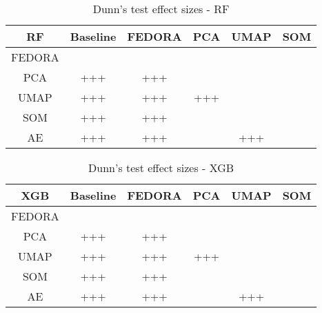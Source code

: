 {\begin{table}[h!]
\centering
\caption{Dunn's test effect sizes - RF}
\label{table:dunn-rf_200_100}
    \begin{tabular}{|c|c|c|c|c|c|}
        \hline
         RF             & Baseline         & FEDORA           & PCA              & UMAP             & SOM               \\
        \hline
         FEDORA         &                  & \cellcolor{gray} & \cellcolor{gray} & \cellcolor{gray} & \cellcolor{gray}  \\
         PCA            & +++              & +++              & \cellcolor{gray} & \cellcolor{gray} & \cellcolor{gray}  \\
         UMAP           & +++              & +++              & +++              & \cellcolor{gray} & \cellcolor{gray}  \\
         SOM            & +++              & +++              &                  &                  & \cellcolor{gray}  \\
         AE             & +++              & +++              &                  & +++              &                   \\
        \hline
    \end{tabular}
\end{table}


\begin{table}[h!]
\centering
\caption{Dunn's test effect sizes - XGB}
\label{table:dunn-xgb_200_100}
   \begin{tabular}{|c|c|c|c|c|c|}
       \hline
        XGB         & Baseline         & FEDORA           & PCA              & UMAP             & SOM               \\
       \hline
        FEDORA      &                  & \cellcolor{gray} & \cellcolor{gray} & \cellcolor{gray} & \cellcolor{gray}  \\
        PCA         & +++              & +++              & \cellcolor{gray} & \cellcolor{gray} & \cellcolor{gray}  \\
        UMAP        & +++              & +++              & +++              & \cellcolor{gray} & \cellcolor{gray}  \\
        SOM         & +++              & +++              &                  &                  & \cellcolor{gray}  \\
        AE          & +++              & +++              &                  & +++              &                   \\
       \hline
   \end{tabular}
\end{table}
}
